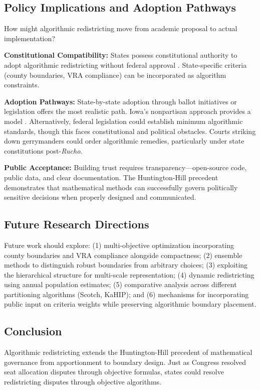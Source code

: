 \subsection{Policy Implications and Adoption Pathways}

How might algorithmic redistricting move from academic proposal to actual implementation?

\textbf{Constitutional Compatibility:} States possess constitutional authority to adopt algorithmic redistricting without federal approval \cite{baker1962}. State-specific criteria (county boundaries, VRA compliance) can be incorporated as algorithm constraints.

\textbf{Adoption Pathways:} State-by-state adoption through ballot initiatives or legislation offers the most realistic path. Iowa's nonpartisan approach provides a model \cite{deford2019implementing}. Alternatively, federal legislation could establish minimum algorithmic standards, though this faces constitutional and political obstacles. Courts striking down gerrymanders could order algorithmic remedies, particularly under state constitutions post-\textit{Rucho}.

\textbf{Public Acceptance:} Building trust requires transparency—open-source code, public data, and clear documentation. The Huntington-Hill precedent demonstrates that mathematical methods can successfully govern politically sensitive decisions when properly designed and communicated.
\subsection{Future Research Directions}

Future work should explore: (1) multi-objective optimization incorporating county boundaries and VRA compliance alongside compactness; (2) ensemble methods \cite{fifield2020automated} to distinguish robust boundaries from arbitrary choices; (3) exploiting the hierarchical structure for multi-scale representation; (4) dynamic redistricting using annual population estimates; (5) comparative analysis across different partitioning algorithms (Scotch, KaHIP); and (6) mechanisms for incorporating public input on criteria weights while preserving algorithmic boundary placement.
\subsection{Conclusion}

Algorithmic redistricting extends the Huntington-Hill precedent of mathematical governance from apportionment to boundary design. Just as Congress resolved seat allocation disputes through objective formulas, states could resolve redistricting disputes through objective algorithms.

